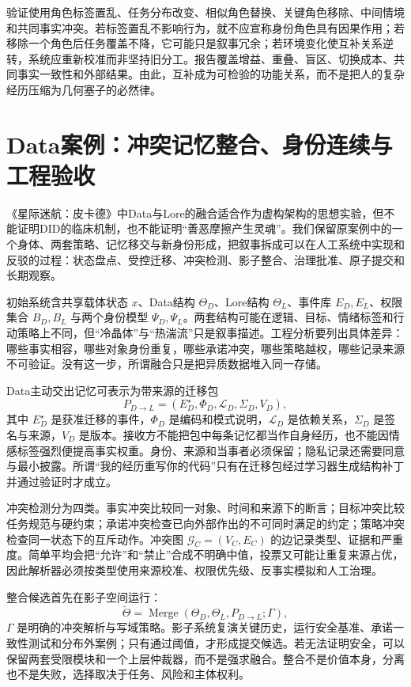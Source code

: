 验证使用角色标签置乱、任务分布改变、相似角色替换、关键角色移除、中间情境和共同事实冲突。若标签置乱不影响行为，就不应宣称身份角色具有因果作用；若移除一个角色后任务覆盖不降，它可能只是叙事冗余；若环境变化使互补关系逆转，系统应重新校准而非坚持旧分工。报告覆盖增益、重叠、盲区、切换成本、共同事实一致性和外部结果。由此，互补成为可检验的功能关系，而不是把人的复杂经历压缩为几何塞子的必然律。

\section{Data案例：冲突记忆整合、身份连续与工程验收}
\label{sec:case_study_data}
《星际迷航：皮卡德》中Data与Lore的融合适合作为虚构架构的思想实验，但不能证明DID的临床机制，也不能证明“善恶摩擦产生灵魂”。我们保留原案例中的一个身体、两套策略、记忆移交与新身份形成，把叙事拆成可以在人工系统中实现和反驳的过程：状态盘点、受控迁移、冲突检测、影子整合、治理批准、原子提交和长期观察。

初始系统含共享载体状态 $x$、Data结构 $\Theta_D$、Lore结构 $\Theta_L$、事件库 $E_D,E_L$、权限集合 $B_D,B_L$ 与两个身份模型 $\Psi_D,\Psi_L$。两套结构可能在逻辑、目标、情绪标签和行动策略上不同，但“冷晶体”与“热湍流”只是叙事描述。工程分析要列出具体差异：哪些事实相容，哪些对象身份重复，哪些承诺冲突，哪些策略越权，哪些记录来源不可验证。没有这一步，所谓融合只是把异质数据堆入同一存储。

Data主动交出记忆可表示为带来源的迁移包
\[
P_{D\rightarrow L}=
(E^\star_D,\Phi_D,\mathcal L_D,\Sigma_D,V_D),
\]
其中 $E^\star_D$ 是获准迁移的事件，$\Phi_D$ 是编码和模式说明，$\mathcal L_D$ 是依赖关系，$\Sigma_D$ 是签名与来源，$V_D$ 是版本。接收方不能把包中每条记忆都当作自身经历，也不能因情感标签强烈便提高事实权重。身份、来源和当事者必须保留；隐私记录还需要同意与最小披露。所谓“我的经历重写你的代码”只有在迁移包经过学习器生成结构补丁并通过验证时才成立。

冲突检测分为四类。事实冲突比较同一对象、时间和来源下的断言；目标冲突比较任务规范与硬约束；承诺冲突检查已向外部作出的不可同时满足的约定；策略冲突检查同一状态下的互斥动作。冲突图 $\mathcal G_C=(V_C,E_C)$ 的边记录类型、证据和严重度。简单平均会把“允许”和“禁止”合成不明确中值，投票又可能让重复来源占优，因此解析器必须按类型使用来源校准、权限优先级、反事实模拟和人工治理。

整合候选首先在影子空间运行：
\[
\tilde\Theta=
\operatorname{Merge}(\Theta_D,\Theta_L,P_{D\rightarrow L};\Gamma),
\]
$\Gamma$ 是明确的冲突解析与写域策略。影子系统复演关键历史，运行安全基准、承诺一致性测试和分布外案例；只有通过阈值，才形成提交候选。若无法证明安全，可以保留两套受限模块和一个上层仲裁器，而不是强求融合。整合不是价值本身，分离也不是失败，选择取决于任务、风险和主体权利。


